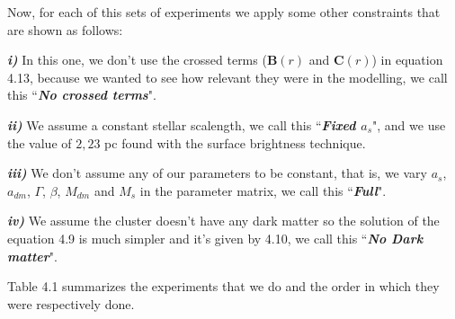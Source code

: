 Now, for each of this sets of experiments we apply some other constraints that are shown as follows: 

\textbf{\textit{i)}} In this one, we don't use the crossed terms ($\mathbf{B}(r)$ and $\mathbf{C}(r)$) in equation 4.13, because we wanted to see how relevant they were in the modelling, we call this ``\textbf{\textit{No crossed terms}}". 

\textbf{\textit{ii)}} We assume a constant stellar scalength, we call this ``\textbf{\textit{Fixed $a_{s}$}}", and we use the value of $2,23$ pc found with the surface brightness technique. 

\textbf{\textit{iii)}} We don't assume any of our parameters to be constant, that is, we vary $a_{s}$, $a_{dm}$, $\Gamma$, $\beta$, $M_{dm}$ and $M_{s}$ in the parameter matrix, we call this ``\textbf{\textit{Full}}". 

\textbf{\textit{iv)}} We assume the cluster doesn't have any dark matter so the solution of the equation 4.9 is much simpler and it's given by 4.10, we call this ``\textbf{\textit{No Dark matter}}".

Table 4.1 summarizes the experiments that we do and the order in which they were respectively done.


